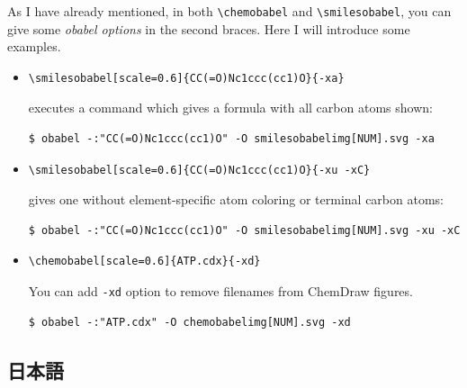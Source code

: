 \documentclass[12pt]{jsarticle}
\begin{document}
As I have already mentioned, in both \verb|\chemobabel| and \verb|\smilesobabel|, you can give some \textit{obabel options} in the second braces.
Here I will introduce some examples.
\begin{itemize}
\item
\begin{verbatim}
\smilesobabel[scale=0.6]{CC(=O)Nc1ccc(cc1)O}{-xa}
\end{verbatim}
executes a command which gives a formula with all carbon atoms shown:
\begin{verbatim}
$ obabel -:"CC(=O)Nc1ccc(cc1)O" -O smilesobabelimg[NUM].svg -xa
\end{verbatim}
\item
\begin{verbatim}
\smilesobabel[scale=0.6]{CC(=O)Nc1ccc(cc1)O}{-xu -xC}
\end{verbatim}
gives one without element-specific atom coloring or terminal carbon atoms:
\begin{verbatim}
$ obabel -:"CC(=O)Nc1ccc(cc1)O" -O smilesobabelimg[NUM].svg -xu -xC
\end{verbatim}
\item
\begin{verbatim}
\chemobabel[scale=0.6]{ATP.cdx}{-xd}
\end{verbatim}
You can add \texttt{-xd} option to remove filenames from ChemDraw figures.
\begin{verbatim}
$ obabel -:"ATP.cdx" -O chemobabelimg[NUM].svg -xd
\end{verbatim}
\end{itemize}

\subsection{日本語}
\end{document}

